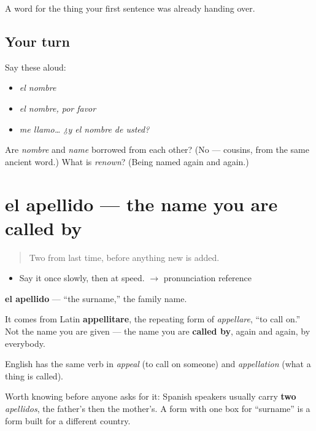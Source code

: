 \begin{grammarlens}[title={What you've built}]
A word for the thing your first sentence was already handing over.
\end{grammarlens}

\subsection*{Your turn}
Say these aloud:

\begin{itemize}
\raggedright
  \item \emph{el nombre}
  \item \emph{el nombre, por favor}
  \item \emph{me llamo… ¿y el nombre de usted?}
\end{itemize}

\begin{tcolorbox}[breakable,colback=teal!4,colframe=teal!35!black,title={Before you move on}]
Are \emph{nombre} and \emph{name} borrowed from each other? (No — cousins, from the same ancient word.) What is \emph{renown}? (Being named again and again.)
\end{tcolorbox}
\section[el apellido]{el apellido — the name you are called by}

\label{lesson:ES-C305-apellido}



\begin{quote}
Two from last time, before anything new is added.
\end{quote}

\begin{sounds}
\begin{itemize}
\raggedright
  \item Say it once slowly, then at speed. $\to$ pronunciation reference
\end{itemize}
\end{sounds}

\begin{cousinweb}
\textbf{el apellido} — \textquotedblleft{}the surname,\textquotedblright{} the family name.

It comes from Latin \textbf{appellitare}, the repeating form of \emph{appellare}, \textquotedblleft{}to call on.\textquotedblright{} Not the name you are given — the name you are \textbf{called by}, again and again, by everybody.

English has the same verb in \emph{appeal} (to call on someone) and \emph{appellation} (what a thing is called).

Worth knowing before anyone asks for it: Spanish speakers usually carry \textbf{two} \emph{apellidos}, the father's then the mother's. A form with one box for \textquotedblleft{}surname\textquotedblright{} is a form built for a different country.
\end{cousinweb}

